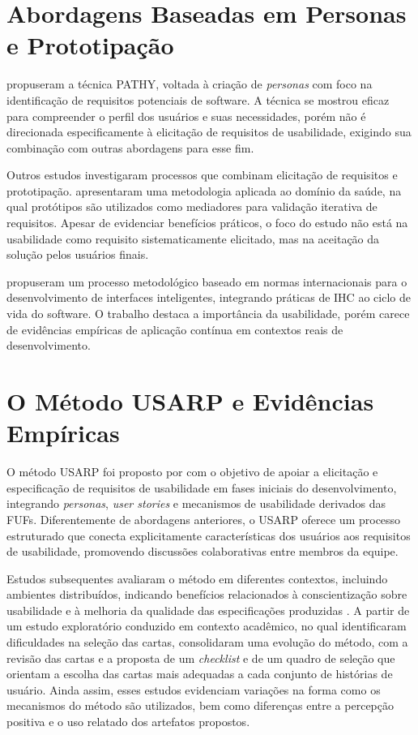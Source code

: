 \section{Abordagens Baseadas em Personas e Prototipação}

 propuseram a técnica PATHY, voltada à criação de \textit{personas} com foco na identificação de requisitos potenciais de software. A técnica se mostrou eficaz para compreender o perfil dos usuários e suas necessidades, porém não é direcionada especificamente à elicitação de requisitos de usabilidade, exigindo sua combinação com outras abordagens para esse fim.

Outros estudos investigaram processos que combinam elicitação de requisitos e prototipação.  apresentaram uma metodologia aplicada ao domínio da saúde, na qual protótipos são utilizados como mediadores para validação iterativa de requisitos. Apesar de evidenciar benefícios práticos, o foco do estudo não está na usabilidade como requisito sistematicamente elicitado, mas na aceitação da solução pelos usuários finais.

 propuseram um processo metodológico baseado em normas internacionais para o desenvolvimento de interfaces inteligentes, integrando práticas de IHC ao ciclo de vida do software. O trabalho destaca a importância da usabilidade, porém carece de evidências empíricas de aplicação contínua em contextos reais de desenvolvimento.

\section{O Método USARP e Evidências Empíricas}

O método USARP foi proposto por  com o objetivo de apoiar a elicitação e especificação de requisitos de usabilidade em fases iniciais do desenvolvimento, integrando \textit{personas}, \textit{user stories} e mecanismos de usabilidade derivados das FUFs. Diferentemente de abordagens anteriores, o USARP oferece um processo estruturado que conecta explicitamente características dos usuários aos requisitos de usabilidade, promovendo discussões colaborativas entre membros da equipe.

Estudos subsequentes avaliaram o método em diferentes contextos, incluindo ambientes distribuídos, indicando benefícios relacionados à conscientização sobre usabilidade e à melhoria da qualidade das especificações produzidas \cite{marques2022}. A partir de um estudo exploratório conduzido em contexto acadêmico, no qual identificaram dificuldades na seleção das cartas,  consolidaram uma evolução do método, com a revisão das cartas e a proposta de um \textit{checklist} e de um quadro de seleção que orientam a escolha das cartas mais adequadas a cada conjunto de histórias de usuário. Ainda assim, esses estudos evidenciam variações na forma como os mecanismos do método são utilizados, bem como diferenças entre a percepção positiva e o uso relatado dos artefatos propostos.

